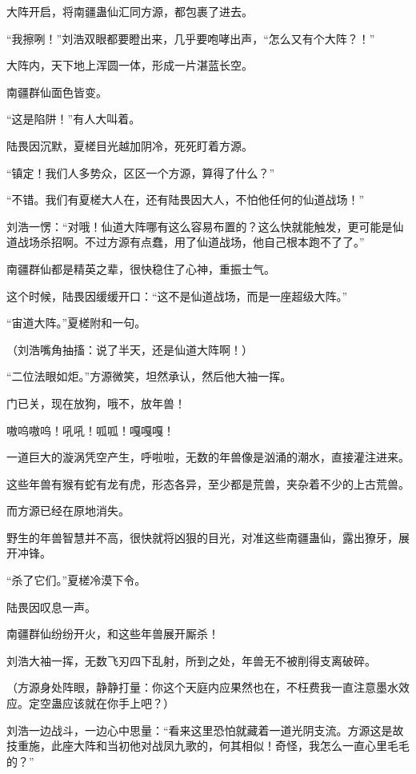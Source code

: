 \begin{this_body}
大阵开启，将南疆蛊仙汇同方源，都包裹了进去。

“我擦咧！”刘浩双眼都要瞪出来，几乎要咆哮出声，“怎么又有个大阵？！”

大阵内，天下地上浑圆一体，形成一片湛蓝长空。

南疆群仙面色皆变。

“这是陷阱！”有人大叫着。

陆畏因沉默，夏槎目光越加阴冷，死死盯着方源。

“镇定！我们人多势众，区区一个方源，算得了什么？”

“不错。我们有夏槎大人在，还有陆畏因大人，不怕他任何的仙道战场！”

刘浩一愣：“对哦！仙道大阵哪有这么容易布置的？这么快就能触发，更可能是仙道战场杀招啊。不过方源有点蠢，用了仙道战场，他自己根本跑不了了。”

南疆群仙都是精英之辈，很快稳住了心神，重振士气。

这个时候，陆畏因缓缓开口：“这不是仙道战场，而是一座超级大阵。”

“宙道大阵。”夏槎附和一句。

（刘浩嘴角抽搐：说了半天，还是仙道大阵啊！）

“二位法眼如炬。”方源微笑，坦然承认，然后他大袖一挥。

门已关，现在放狗，哦不，放年兽！

嗷呜嗷呜！吼吼！呱呱！嘎嘎嘎！

一道巨大的漩涡凭空产生，呼啦啦，无数的年兽像是汹涌的潮水，直接灌注进来。

这些年兽有猴有蛇有龙有虎，形态各异，至少都是荒兽，夹杂着不少的上古荒兽。

而方源已经在原地消失。

野生的年兽智慧并不高，很快就将凶狠的目光，对准这些南疆蛊仙，露出獠牙，展开冲锋。

“杀了它们。”夏槎冷漠下令。

陆畏因叹息一声。

南疆群仙纷纷开火，和这些年兽展开厮杀！

刘浩大袖一挥，无数飞刃四下乱射，所到之处，年兽无不被削得支离破碎。

（方源身处阵眼，静静打量：你这个天庭内应果然也在，不枉费我一直注意墨水效应。定空蛊应该就在你手上吧？）

刘浩一边战斗，一边心中思量：“看来这里恐怕就藏着一道光阴支流。方源这是故技重施，此座大阵和当初他对战凤九歌的，何其相似！奇怪，我怎么一直心里毛毛的？”

\end{this_body}

